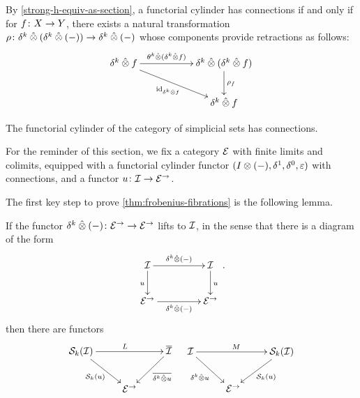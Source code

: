 \documentclass[reqno,10pt,a4paper,oneside,draft]{amsart}
\begin{document}
\begin{remark} \label{thm:retraction-for-connections}
By \cref{strong-h-equiv-as-section}, a functorial cylinder has connections if and only if for $f \co X \to Y$, there exists a natural transformation $\rho \co \kcyl \hatotimes (\kcyl \hatotimes (-)) \to \kcyl \hatotimes (-)$ whose components provide retractions as follows:
\begin{gather*}
\xymatrix@C+3em{
  \kcyl \hatotimes f
  \ar[r]^-{\thetak \hatotimes (\kcyl \hatotimes f)}
  \ar[dr]_{\id_{\kcyl \hatotimes f}}
&
  \kcyl \hatotimes (\kcyl \hatotimes f)  \ar[d]^{\rho_f}
\\&
  \kcyl \hatotimes f
}
\end{gather*}
\end{remark}

\begin{example}
The functorial cylinder of the category of simplicial sets has connections.
\end{example}

\begin{example} 
\end{example}

For the reminder of this section, we fix a category $\catE$ with finite limits and colimits, equipped with a functorial cylinder functor $(\interval \otimes (-), \rcyl, \lcyl, \ccyl)$ with connections, and a functor $u \co \cal{I} \to \cal{E}^\to$.

\medskip

The first key step to prove \cref{thm:frobenius-fibrations} is the following lemma.

\begin{lemma} \label{thm:she-to-retract-closure}
If the functor $\kcyl \hatotimes (-) \co \catE^\to \to \catE^\to$ lifts to $\cal{I}$, in the sense that there is a diagram of the form
\[
\xymatrix@C+2em{
  \cal{I}  \ar[d]_u \ar[r]^{\kcyl \hatotimes (-)} & \cal{I} \ar[d]^{u} \\
  \cal{E}^\to \ar[r]_{\kcyl \hatotimes (-)} & \cal{E}^\to} \, .
\]
then there are functors
\begin{align*}
\xycenter{
  \cal{S}_k(\cal{I}) \ar[dr]_{\cal{S}_k(u)} \ar[rr]^L & & \overline{\cal{I}} \ar[dl]^-{\overline{\kcyl \hatotimes u}} \\
  & \catE^\to &
}
&&
\xycenter{
 \cal{I} \ar[dr]_{\kcyl \hatotimes u} \ar[rr]^M & & \cal{S}_k(\cal{I}) \ar[dl]^{\cal{S}_k(u)} \\
 & \ \catE^\to &
}
\end{align*}
\end{lemma}
\end{document}
